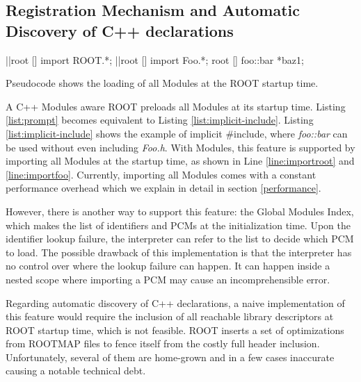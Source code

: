 \documentclass{webofc}
\begin{document}
\subsection{Registration Mechanism and Automatic Discovery of C++ declarations}
\label{subsec:preloading}

\begin{listing}[h]
    \noindent
    \begin{minipage}[h]{.7\textwidth}
    \begin{cppcode*}{}
    |\label{line:importroot}|root [] import ROOT.*;
    |\label{line:importfoo}|root [] import Foo.*;
    root [] foo::bar *baz1;
    \end{cppcode*}
    \end{minipage}
    \caption{Pseudocode shows the loading of all Modules at the ROOT startup time.}
    \label{list:implicit-include}
\end{listing}

A C++ Modules aware ROOT preloads all Modules at its startup time. Listing \ref{list:prompt} becomes equivalent to Listing \ref{list:implicit-include}. Listing \ref{list:implicit-include} shows the example of implicit \#include, where {\it foo::bar} can be used without even including {\it Foo.h}. With Modules, this feature is supported by importing all Modules at the startup time, as shown in Line \ref{line:importroot} and \ref{line:importfoo}. Currently, importing all Modules comes with a constant performance overhead which we explain in detail in section \ref{performance}.

However, there is another way to support this feature: the Global Modules Index, which makes the list of identifiers and PCMs at the initialization time. Upon the identifier lookup failure, the interpreter can refer to the list to decide which PCM to load. The possible drawback of this implementation is that the interpreter has no control over where the lookup failure can happen. It can happen inside a nested scope where importing a PCM may cause an incomprehensible error.

Regarding automatic discovery of C++ declarations, a naive implementation of this feature would require the inclusion of all reachable library descriptors at ROOT startup time, which is not feasible. ROOT inserts a set of optimizations from ROOTMAP files to fence itself from the costly full header inclusion. Unfortunately, several of them are home-grown and in a few cases inaccurate causing a notable technical debt.
\end{document}
